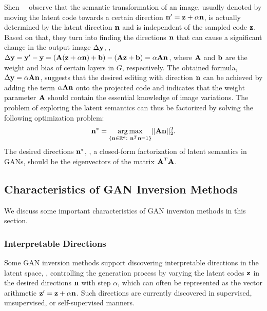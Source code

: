 Shen~\etal~\cite{shen2021closedform} observe that the semantic transformation of an image, usually denoted by moving the latent code towards a certain direction $\mathbf{n}^{\prime} = \mathbf{z} + \alpha \mathbf{n}$, is actually determined by the latent direction $\mathbf{n}$ and is independent of the sampled code $\mathbf{z}$.
Based on that, they turn into finding the directions $\mathbf{n}$ that can cause a significant change in the output image $\Delta\mathbf{y}$, \ie, $\Delta\mathbf{y} =\mathbf{y}^{\prime}-\mathbf{y}= (\mathbf{A}(\mathbf{z} + \alpha\mathbf{n}) + \mathbf{b}) - (\mathbf{A}\mathbf{z} + \mathbf{b}) = \alpha\mathbf{A}\mathbf{n}$, where $\mathbf{A}$ and $\mathbf{b}$ are the weight and bias of certain layers in $G$, respectively. 
The obtained formula, $\Delta\mathbf{y} = \alpha\mathbf{A}\mathbf{n}$, suggests that the desired editing with direction $\mathbf{n}$ can be achieved by adding the term $\alpha\mathbf{A}\mathbf{n}$ onto the projected code and indicates that the weight parameter $\mathbf{A}$ should contain the essential knowledge of image variations.
The problem of exploring the latent semantics can thus be factorized by solving the following optimization problem:
\begin{equation}
  \n^* = \underset{\{\n\in\R^d:\ \n^T\n = 1\}}{\arg\max} ||\A\n||_2^2.  
  \label{eq:single-optimization}    
\end{equation}
The desired directions $\mathbf{n}^*$, \ie, a closed-form factorization of latent semantics in GANs, should be the eigenvectors of the matrix $\mathbf{A}^T\mathbf{A}$.

\subsection{Characteristics of GAN Inversion Methods}
\label{sec:characteristics}

We discuss some important characteristics of GAN inversion methods in this section. 

\subsubsection{Interpretable Directions}
\label{sec:interpretable-directions}

Some GAN inversion methods support discovering interpretable directions in the latent space, \ie, controlling the generation process by varying the latent codes $\mathbf{z}$ in the desired directions $\mathbf{n}$ with step $\alpha$, which can often be represented as the vector arithmetic $\mathbf{z}^{\prime}=\mathbf{z}+\alpha\mathbf{n}$.
Such directions are currently discovered in supervised, unsupervised, or self-supervised manners.

